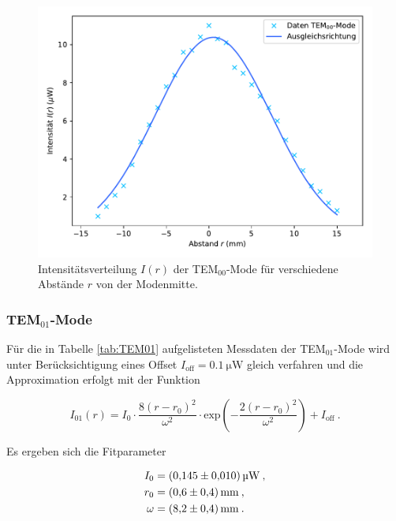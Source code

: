 \vspace{-15pt}

\begin{figure}[H]
    \centering
    \includegraphics[scale=0.65]{content/TEM00.pdf}
    \vspace{-10pt}
    \caption{Intensitätsverteilung $I(r)$ der TEM$_{00}$-Mode für verschiedene Abstände $r$ von der Modenmitte.}
    \label{fig:TEM00}
\end{figure}

\subsubsection{TEM$_{01}$-Mode}

Für die in Tabelle \ref{tab:TEM01} aufgelisteten Messdaten der TEM$_{01}$-Mode
wird unter Berücksichtigung eines Offset $I_\text{off} = \SI{0.1}{\micro\watt}$ gleich verfahren 
und die Approximation erfolgt mit der Funktion

\vspace{-5pt}
\begin{equation}
    I_{01}(r) = I_0 \cdot \frac{8(r-r_0)^2}{\omega^2} \cdot \text{exp}\left(-\frac{2(r-r_0)^2}{\omega^2}\right) + I_\text{off} \: .
\end{equation}

Es ergeben sich die Fitparameter

\vspace{-15pt}
\begin{align*}
    I_0 &= \SI{0.145 +- 0.010}{\micro\watt} \: , \\
    r_0 &= \SI{0.6 +- 0.4}{\milli\meter}\: , \\
    \omega &= \SI{8.2 +- 0.4}{\milli\meter} \: .
\end{align*}

